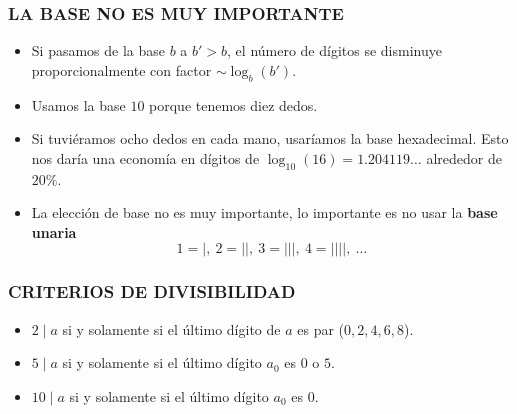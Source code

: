 \begin{frame}
  \frametitle{LA BASE NO ES MUY IMPORTANTE}

  \begin{itemize}
  \item<2-> Si pasamos de la base $b$ a $b' > b$, el número de dígitos se
    disminuye proporcionalmente con factor $\sim \log_b (b')$.

  \item<3-> Usamos la base $10$ porque tenemos diez dedos.

  \item<4-> Si tuviéramos ocho dedos en cada mano, usaríamos la base
    hexadecimal. Esto nos daría una economía en dígitos de
    $\log_{10} (16) = 1.204119\ldots$ alrededor de $20\%$.

    \vspace{0.5em}


  \item<6-> La elección de base no es muy
    importante, lo importante es no usar la \textbf{base unaria}
    \[ 1 = |, ~ 2 = ||, ~ 3 = |||, ~ 4 = ||||, ~ \ldots \]
  \end{itemize}
\end{frame}

\begin{frame}
  \frametitle{CRITERIOS DE DIVISIBILIDAD}


  \begin{itemize}
  \item<3-> $2\mid a$ si y solamente si el último dígito de $a$ es par
    ($0, 2, 4, 6, 8$).

  \item<4-> $5\mid a$ si y solamente si el último dígito $a_0$ es $0$ o $5$.

  \item<5-> $10\mid a$ si y solamente si el último dígito $a_0$ es $0$.
  \end{itemize}

\end{frame}

